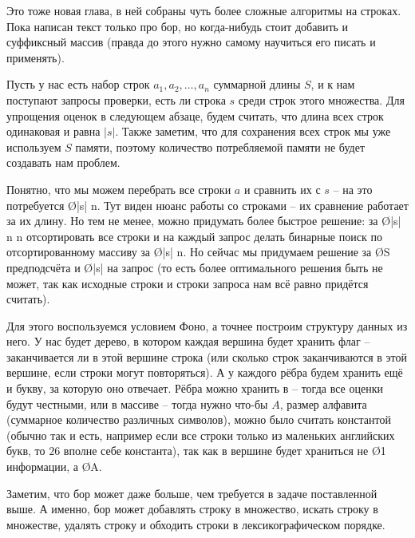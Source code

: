 Это тоже новая глава, в ней собраны чуть более сложные алгоритмы на строках. Пока написан текст только про бор, но когда-нибудь стоит добавить и суффиксный массив (правда до этого нужно самому научиться его писать и применять).


Пусть у нас есть набор строк $a_1, a_2, \ldots, a_n$ суммарной длины $S$, и к нам поступают запросы проверки, есть ли строка $s$ среди строк этого множества. Для упрощения оценок в следующем абзаце, будем считать, что длина всех строк одинаковая и равна $|s|$. Также заметим, что для сохранения всех строк мы уже используем $S$ памяти, поэтому количество потребляемой памяти не будет создавать нам проблем.

Понятно, что мы можем перебрать все строки $a$ и сравнить их с $s$ -- на это потребуется \O{|s| \cdot n}. Тут виден нюанс работы со строками -- их сравнение работает за их длину. Но тем не менее, можно придумать более быстрое решение: за \O{|s| \cdot n \log n} отсортировать все строки и на каждый запрос делать бинарные поиск по отсортированному массиву за \O{|s| \cdot \log n}. Но сейчас мы придумаем решение за \O{S} предподсчёта и \O{|s|} на запрос (то есть более оптимального решения быть не может, так как исходные строки и строки запроса нам всё равно придётся считать).

Для этого воспользуемся условием Фоно, а точнее построим структуру данных из него. У нас будет дерево, в котором каждая вершина будет хранить флаг -- заканчивается ли в этой вершине строка (или сколько строк заканчиваются в этой вершине, если строки могут повторяться). А у каждого рёбра будем хранить ещё и букву, за которую оно отвечает. Рёбра можно хранить в  -- тогда все оценки будут честными, или в массиве -- тогда нужно что-бы $A$, размер алфавита (суммарное количество различных символов), можно было считать константой (обычно так и есть, например если все строки только из маленьких английских букв, то $26$ вполне себе константа), так как в вершине будет храниться не \O{1} информации, а \O{A}.

Заметим, что бор может даже больше, чем требуется в задаче поставленной выше. А именно, бор может добавлять строку в множество, искать строку в множестве, удалять строку и обходить строки в лексикографическом порядке.

